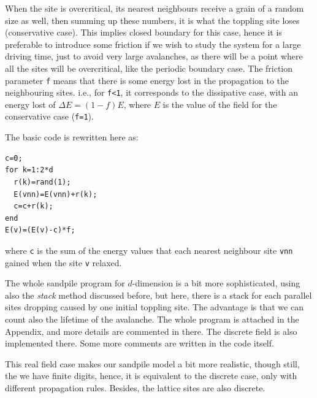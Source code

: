 When the site is overcritical, its nearest neighbours receive a grain of a random size as well, then summing up these numbers, it is what the toppling site loses (conservative case).
This implies closed boundary for this case, hence it is preferable to introduce some friction if we wish to study the system for a large driving time, just to avoid very large avalanches,
as there will be a point where all the sites will be overcritical, like the periodic boundary case. 
The friction parameter \texttt{f} means that there is some energy lost in the propagation to the neighbouring sites.
i.e., for \texttt{f<1}, it corresponds to the dissipative case, 
with an energy lost of $\Delta E=(1-f)E$, where $E$ is the value of the field for the conservative case (\texttt{f=1}).

The basic code is rewritten here as:
\begin{lstlisting}
c=0;
for k=1:2*d
  r(k)=rand(1);                    
  E(vnn)=E(vnn)+r(k); 
  c=c+r(k);
end        
E(v)=(E(v)-c)*f;
\end{lstlisting}
where \texttt{c} is the sum of the energy values that each nearest neighbour site \texttt{vnn} gained when the site \texttt{v} relaxed. 



The whole sandpile program for $d$-dimension is a bit more sophisticated, using also the \emph{stack} method discussed before, 
but here, there is a stack for each parallel sites dropping caused by one initial toppling site. The advantage is that we can count also the lifetime of the avalanche. 
The whole program is attached in the Appendix, and more details are commented in there. The discrete field is also implemented there. 
Some more comments are written in the code itself.

This real field case makes our sandpile model a bit more realistic, though still, the we have finite digits, hence, it is equivalent to the discrete case, only with different propagation rules.
Besides, the lattice sites are also discrete.






